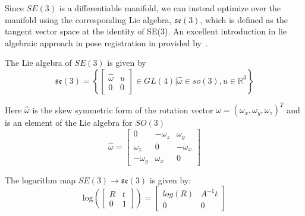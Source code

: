 \documentclass[0-suturing.tex]{subfiles}
\begin{document}
Since $SE(3)$ is a differentiable manifold, we can instead optimize over the manifold using the corresponding Lie algebra, $\mathfrak{se}(3)$, which is defined as the tangent vector space at the identity of SE(3). An excellent introduction in lie algebraic approach in pose registration in provided by~\citet{Agrawal2006Lie}.

\noindent The Lie algebra of $SE(3)$ is given by
\begin{equation}
    \mathfrak{se}(3) = \left\{
    \begin{bmatrix}
        \hat{\omega} & u \\
        0 & 0
    \end{bmatrix}
    \in GL(4) \rvert \hat{\omega}\in so(3), u \in \mathbb{R}^3
    \right\}
\end{equation}

\noindent Here $\hat{\omega}$ is the skew symmetric form of the rotation vector
$\omega = (\omega_x, \omega_y, \omega_z)^T$ and is an element of the Lie algebra for $SO(3)$
\begin{equation}
    \hat{\omega} =
    \begin{bmatrix}
        0 & -\omega_z & \omega_y  \\
        \omega_z & 0 & -\omega_x \\
        -\omega_y & \omega_x & 0
    \end{bmatrix}
\end{equation}

\noindent The logarithm map $SE(3) \to \mathfrak{se}(3)$ is given by:
\begin{equation}
    \text{log}\left(
        \begin{bmatrix}
            R & t \\
            0 & 1
        \end{bmatrix}
    \right)  =
    \begin{bmatrix}
        log(R) & A^{-1}t \\
        0 & 0
    \end{bmatrix}
    \label{eq:logMap}
\end{equation}
\end{document}
